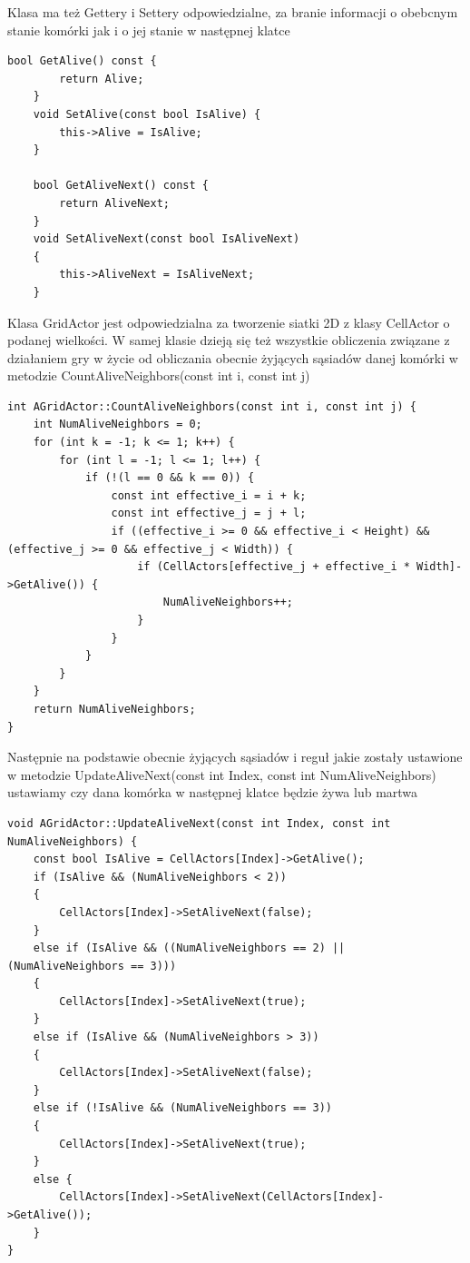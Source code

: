\documentclass[a4paper,12pt,reqno]{article}
\begin{document}
Klasa ma też Gettery i Settery odpowiedzialne, za branie informacji o obebcnym stanie komórki jak i o jej stanie w następnej klatce
\begin{lstlisting}[frame=single]  % Start your code-block
	bool GetAlive() const {
		return Alive;
	}
	void SetAlive(const bool IsAlive) {
		this->Alive = IsAlive;
	}

	bool GetAliveNext() const {
		return AliveNext;
	}
	void SetAliveNext(const bool IsAliveNext)
	{
		this->AliveNext = IsAliveNext;
	}

\end{lstlisting}

Klasa GridActor jest odpowiedzialna za tworzenie siatki 2D z klasy CellActor o podanej wielkości. W samej klasie dzieją się też wszystkie obliczenia związane z działaniem gry w życie od obliczania obecnie żyjących sąsiadów danej komórki w metodzie CountAliveNeighbors(const int i, const int j)

\begin{lstlisting}
int AGridActor::CountAliveNeighbors(const int i, const int j) {
	int NumAliveNeighbors = 0;
	for (int k = -1; k <= 1; k++) {
		for (int l = -1; l <= 1; l++) {
			if (!(l == 0 && k == 0)) {
				const int effective_i = i + k;
				const int effective_j = j + l;
				if ((effective_i >= 0 && effective_i < Height) && (effective_j >= 0 && effective_j < Width)) {
					if (CellActors[effective_j + effective_i * Width]->GetAlive()) {
						NumAliveNeighbors++;
					}
				}
			}
		}
	}
	return NumAliveNeighbors;
}
\end{lstlisting}

Następnie na podstawie obecnie żyjących sąsiadów i reguł jakie zostały ustawione w metodzie UpdateAliveNext(const int Index, const int NumAliveNeighbors) ustawiamy czy dana komórka w następnej klatce będzie żywa lub martwa

\begin{lstlisting}
void AGridActor::UpdateAliveNext(const int Index, const int NumAliveNeighbors) {
	const bool IsAlive = CellActors[Index]->GetAlive();
	if (IsAlive && (NumAliveNeighbors < 2))
	{
		CellActors[Index]->SetAliveNext(false);
	}
	else if (IsAlive && ((NumAliveNeighbors == 2) || (NumAliveNeighbors == 3)))
	{
		CellActors[Index]->SetAliveNext(true);
	}
	else if (IsAlive && (NumAliveNeighbors > 3))
	{
		CellActors[Index]->SetAliveNext(false);
	}
	else if (!IsAlive && (NumAliveNeighbors == 3))
	{
		CellActors[Index]->SetAliveNext(true);
	}
	else {
		CellActors[Index]->SetAliveNext(CellActors[Index]->GetAlive());
	}
}
\end{lstlisting}
\end{document}
